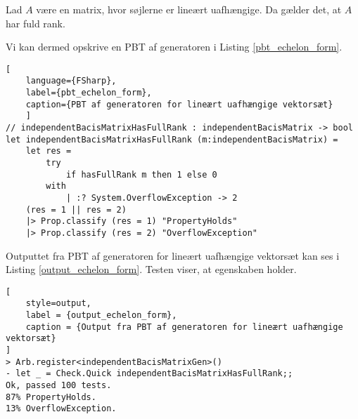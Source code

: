\begin{egenskab}
    Lad \( A \) være en matrix, hvor søjlerne er lineært uafhængige. Da gælder det, at \( A \) har fuld rank.
\end{egenskab}

Vi kan dermed opskrive en PBT af generatoren i Listing \ref{pbt_echelon_form}.

\begin{lstlisting}[
    language={FSharp}, 
    label={pbt_echelon_form}, 
    caption={PBT af generatoren for lineært uafhængige vektorsæt}
    ]
// independentBacisMatrixHasFullRank : independentBacisMatrix -> bool
let independentBacisMatrixHasFullRank (m:independentBacisMatrix) =
    let res =
        try 
            if hasFullRank m then 1 else 0
        with
            | :? System.OverflowException -> 2
    (res = 1 || res = 2)
    |> Prop.classify (res = 1) "PropertyHolds"
    |> Prop.classify (res = 2) "OverflowException"
\end{lstlisting}

Outputtet fra PBT af generatoren for lineært uafhængige vektorsæt kan ses i Listing \ref{output_echelon_form}. Testen viser, at egenskaben holder.

\begin{lstlisting}[
    style=output,
    label = {output_echelon_form},
    caption = {Output fra PBT af generatoren for lineært uafhængige vektorsæt}
]
> Arb.register<independentBacisMatrixGen>()
- let _ = Check.Quick independentBacisMatrixHasFullRank;;
Ok, passed 100 tests.
87% PropertyHolds.
13% OverflowException.
\end{lstlisting}
